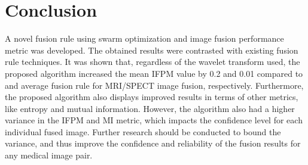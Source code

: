 \documentclass{article}
\begin{document}
\section{Conclusion}
\label{sec:conclusion}
A novel fusion rule using swarm optimization and image fusion performance metric was developed. The obtained results were contrasted with existing fusion rule techniques. It was shown that, regardless of the wavelet transform used, the proposed algorithm increased the mean IFPM value by 0.2 and 0.01 compared to \cite{Wang2004} and average fusion rule for MRI/SPECT image fusion, respectively. Furthermore, the proposed algorithm also displays improved results in terms of other metrics, like entropy and mutual information.
However, the algorithm also had a higher variance in the IFPM and MI metric, which impacts the confidence level for each individual fused image.
Further research should be conducted to bound the variance, and thus improve the confidence and reliability of the fusion results for any medical image pair.


\end{document}
